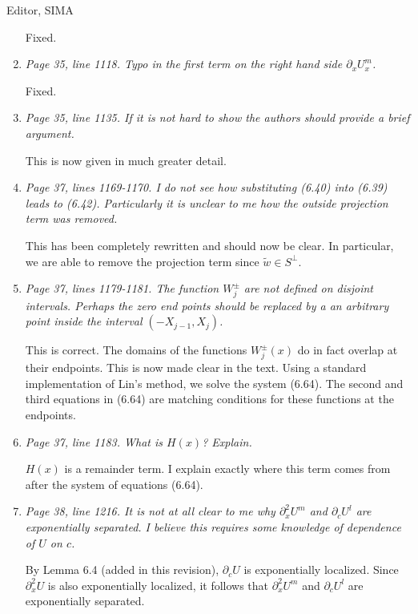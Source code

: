 \documentclass[11pt]{letter}
\begin{document}
\begin{letter}{Editor, SIMA}
\begin{enumerate}
Fixed.

\item \emph{Page 35, line 1118. Typo in the first term on the right hand side $\partial_x U_x^m$.}
\vspace{4mm}

Fixed.

\item \emph{Page 35, line 1135. If it is not hard to show the authors should provide a brief argument.}
\vspace{4mm}

This is now given in much greater detail.

\item \emph{Page 37, lines 1169-1170. I do not see how substituting (6.40) into (6.39) leads to (6.42). Particularly it is unclear to me how the outside projection term was removed.}
\vspace{4mm}

This has been completely rewritten and should now be clear. In particular, we are able to remove the projection term since $\tilde{w} \in S^\perp$.

\item \emph{Page 37, lines 1179-1181. The function $W_j^\pm$ are not defined on disjoint intervals. Perhaps the zero end points should be replaced by a an arbitrary point inside the interval $(-X_{j-1},X_j)$.}
\vspace{4mm}

This is correct. The domains of the functions $W_j^\pm(x)$ do in fact overlap at their endpoints. This is now made clear in the text. Using a standard implementation of Lin's method, we solve the system (6.64). The second and third equations in (6.64) are matching conditions for these functions at the endpoints.

\item \emph{Page 37, line 1183. What is $H(x)$? Explain.}
\vspace{4mm}

$H(x)$ is a remainder term. I explain exactly where this term comes from after the system of equations (6.64).

\item \emph{Page 38, line 1216. It is not at all clear to me why $\partial_x^2 U^m$ and $\partial_c U^l$ are exponentially separated. I believe this requires some knowledge of dependence of $U$ on $c$.}
\vspace{4mm}

By Lemma 6.4 (added in this revision), $\partial_c U$ is exponentially localized. Since $\partial_x^2 U$ is also exponentially localized, it follows that $\partial_x^2 U^m$ and $\partial_c U^l$ are exponentially separated.


\end{enumerate}
\end{letter}
\end{document}
